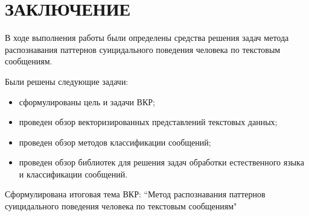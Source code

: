 \section*{ЗАКЛЮЧЕНИЕ}
В ходе выполнения работы были определены средства решения задач метода распознавания паттернов суицидального поведения человека по текстовым сообщениям.

Были решены следующие задачи:
\begin{itemize}
	\item сформулированы цель и задачи ВКР;
	\item проведен обзор векторизированных представлений текстовых данных;
	\item проведен обзор методов классификации сообщений;
	\item проведен обзор библиотек для решения задач обработки естественного языка и классификации сообщений.
\end{itemize}

Сформулирована итоговая тема ВКР: ``Метод распознавания паттернов суицидального поведения человека по текстовым сообщениям"

\pagebreak